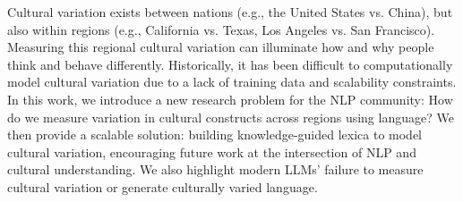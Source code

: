 Cultural variation exists between nations (e.g., the United States vs. China), but also within regions (e.g., California vs. Texas, Los Angeles vs. San Francisco). Measuring this regional cultural variation can illuminate how and why people think and behave differently. Historically, it has been difficult to computationally model cultural variation due to a lack of training data and scalability constraints.  In this work, we introduce a new research problem for the NLP community: How do we measure variation in cultural constructs across regions using language? We then provide a scalable solution: building knowledge-guided lexica to model cultural variation, encouraging future work at the intersection of NLP and cultural understanding. We also highlight modern LLMs' failure to measure cultural variation or generate culturally varied language.